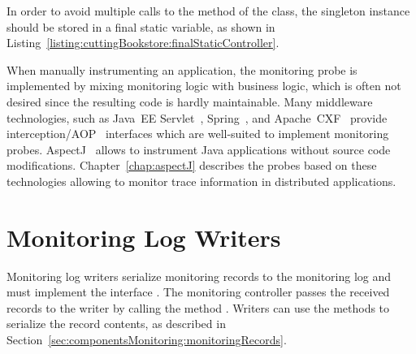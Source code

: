 

\noindent In order to avoid multiple calls to the  method of the %
 class, the singleton instance should be stored %
in a final static variable, as shown in Listing~\ref{listing:cuttingBookstore:finalStaticController}.



\noindent When manually instrumenting an application, the monitoring probe is implemented %
by mixing monitoring logic with business logic, which is often not desired since %
the resulting code is hardly maintainable. %
Many middleware technologies, such as Java~EE Servlet~\cite{JavaServletTechnology-WebSite}, %
Spring~\cite{Spring-WebSite}, and %
Apache~CXF~\cite{CXF-WebSite} provide interception/AOP~\cite{Kiczales1997} interfaces %
which are well-suited to implement monitoring probes. AspectJ~\cite{AspectJ-WebSite} allows to %
instrument Java applications without source code modifications. %
Chapter~\ref{chap:aspectJ} describes the \Kieker{} probes based on these technologies allowing to %
monitor trace information in distributed applications. 

\section{Monitoring Log Writers}\label{sec:monitoring-log-writers}

Monitoring log writers serialize monitoring records to the monitoring log and  %
must implement the interface . The monitoring %
controller passes the received records to the writer by calling the method %
. Writers can use the methods to serialize the %
record contents, as described in Section~\ref{sec:componentsMonitoring:monitoringRecords}. 

